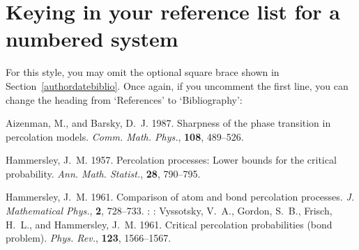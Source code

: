 \section{Keying in your reference list for a numbered system}

For this style, you may omit the optional square brace shown in Section~\ref{authordatebiblio}. Once again, if you uncomment the first line, you can change the heading from `References' to `Bibliography':
%
\begin{smallverbatim}
  \begin{thebibliography}{8}

    Aizenman, M., and Barsky, D.~J. 1987.
    Sharpness of the phase transition in percolation models.
    {\em Comm. Math. Phys.}, {\bf 108}, 489--526.

    Hammersley, J.~M. 1957.
    Percolation processes: Lower bounds for the critical probability.
    {\em Ann. Math. Statist.}, {\bf 28}, 790--795.

    Hammersley, J.~M. 1961.
    Comparison of atom and bond percolation processes.
    {\em J. Mathematical Phys.}, {\bf 2}, 728--733.
      :
      :
    Vyssotsky, V.~A., Gordon, S.~B., Frisch, H.~L., and Hammersley, J.~M. 1961.
    Critical percolation probabilities (bond problem).
    {\em Phys. Rev.}, {\bf 123}, 1566--1567.

  \end{thebibliography}
\end{smallverbatim}

\endinput